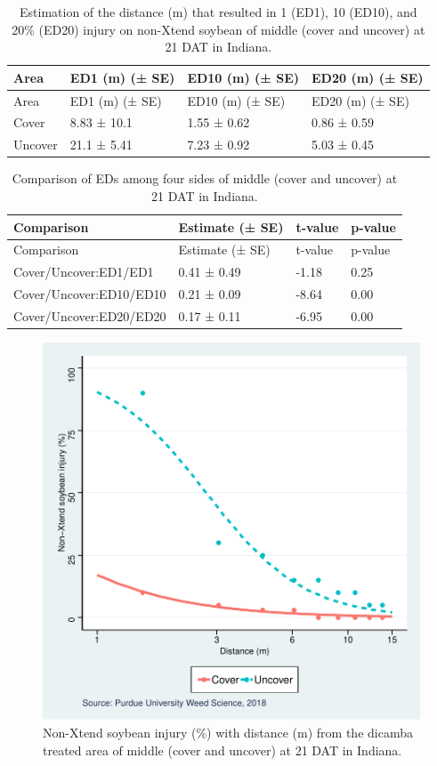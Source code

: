 \documentclass[]{article}
\begin{document}
\begin{longtable}[]{@{}llll@{}}
\caption{Estimation of the distance (m) that resulted in 1 (ED1), 10
(ED10), and 20\% (ED20) injury on non-Xtend soybean of middle (cover and
uncover) at 21 DAT in Indiana.}\tabularnewline
\toprule
Area & ED1 (m) (± SE) & ED10 (m) (± SE) & ED20 (m) (± SE)\tabularnewline
\midrule
\endfirsthead
\toprule
Area & ED1 (m) (± SE) & ED10 (m) (± SE) & ED20 (m) (± SE)\tabularnewline
\midrule
\endhead
Cover & 8.83 ± 10.1 & 1.55 ± 0.62 & 0.86 ± 0.59\tabularnewline
Uncover & 21.1 ± 5.41 & 7.23 ± 0.92 & 5.03 ± 0.45\tabularnewline
\bottomrule
\end{longtable}

\begin{longtable}[]{@{}llll@{}}
\caption{Comparison of EDs among four sides of middle (cover and
uncover) at 21 DAT in Indiana.}\tabularnewline
\toprule
Comparison & Estimate (± SE) & t-value & p-value\tabularnewline
\midrule
\endfirsthead
\toprule
Comparison & Estimate (± SE) & t-value & p-value\tabularnewline
\midrule
\endhead
Cover/Uncover:ED1/ED1 & 0.41 ± 0.49 & -1.18 & 0.25\tabularnewline
Cover/Uncover:ED10/ED10 & 0.21 ± 0.09 & -8.64 & 0.00\tabularnewline
Cover/Uncover:ED20/ED20 & 0.17 ± 0.11 & -6.95 & 0.00\tabularnewline
\bottomrule
\end{longtable}

\begin{figure}
\centering
\includegraphics{Report_files/figure-latex/unnamed-chunk-33-1.pdf}
\caption{Non-Xtend soybean injury (\%) with distance (m) from the
dicamba treated area of middle (cover and uncover) at 21 DAT in
Indiana.}
\end{figure}
\end{document}
